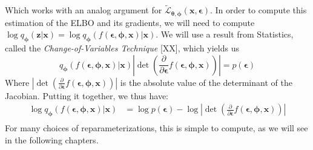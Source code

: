 \documentclass[12pt]{report}
\theoremstyle{definition}
\begin{document}
Which works with an analog argument for $\tilde{\mathcal{L}}_{\pmb{\theta}, \pmb{\phi}}(\mathbf{x}, \pmb{\epsilon})$. In order to compute this estimation of the ELBO and its gradients, we will need to compute $\log q_{\mathbf{\phi}}(\mathbf{z}|\mathbf{x})=\log q_{\mathbf{\phi}}(f(\pmb{\epsilon}, \pmb{\phi}, \mathbf{x})|\mathbf{x})$. 
We will use a result from Statistics, called the \emph{Change-of-Variables Technique} [XX], which yields us 
\begin{equation}
q_{\mathbf{\phi}}(f(\pmb{\epsilon}, \pmb{\phi}, \mathbf{x})|\mathbf{x}) \left|\det \left(\frac{\partial}{\partial \pmb{\epsilon}}f(\pmb{\epsilon}, \pmb{\phi}, \mathbf{x})\right)\right| = p(\pmb{\epsilon})
\end{equation}
Where $\left|\det \left(\frac{\partial}{\partial \pmb{\epsilon}}f(\pmb{\epsilon}, \pmb{\phi}, \mathbf{x})\right)\right|$ is the absolute value of the determinant of the Jacobian. Putting it together, we thus have: 
\begin{equation}
\begin{split}
\log q_{\mathbf{\phi}}(f(\pmb{\epsilon}, \pmb{\phi}, \mathbf{x})|\mathbf{x}) & = \log p(\pmb{\epsilon}) - \log \left|\det \left(\frac{\partial}{\partial \pmb{\epsilon}}f(\pmb{\epsilon}, \pmb{\phi}, \mathbf{x})\right)\right| \\
\end{split}
\end{equation}
For many choices of reparameterizations, this is simple to compute, as we will see in the following chapters.
\end{document}
